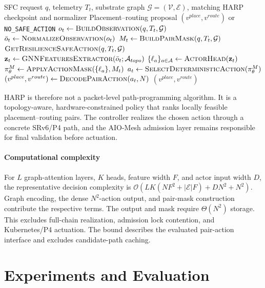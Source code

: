 \documentclass[final,5p]{elsarticle}
\newcommand{\rev}[1]{\textcolor{BrickRed}{#1}}
\begin{document}
\begin{algorithm}[t]
\caption{\rev{HARP placement--routing proposal decision procedure}}
\label{alg:harp_decision}
\small
\begin{algorithmic}[1]
\Require SFC request $q$, telemetry $T_t$, substrate graph $\mathcal{G}=(\mathcal{V},\mathcal{E})$, matching HARP checkpoint and normalizer
\Ensure Placement--routing proposal $(v^{place},v^{route})$ or \texttt{NO\_SAFE\_ACTION}
\State $o_t\gets\textsc{BuildObservation}(q,T_t,\mathcal{G})$
\State $\bar{o}_t\gets\textsc{NormalizeObservation}(o_t)$
\State $M_t\gets\textsc{BuildPairMask}(q,T_t,\mathcal{G})$
    \State \Return $\textsc{GetResilienceSafeAction}(q,T_t,\mathcal{G})$
\EndIf
\State $\mathbf{z}_t\gets\textsc{GNNFeaturesExtractor}(\bar{o}_t;\mathcal{A}_{topo})$
\State $\{\ell_a\}_{a\in\mathcal{A}}\gets\textsc{ActorHead}(\mathbf{z}_t)$
\State $\pi^M_\theta\gets\textsc{ApplyActionMask}(\{\ell_a\},M_t)$
\State $a_t\gets\textsc{SelectDeterministicAction}(\pi^M_\theta)$
\State $(v^{place},v^{route})\gets\textsc{DecodePairAction}(a_t,N)$
\State \Return $(v^{place},v^{route})$
\end{algorithmic}
\end{algorithm}

HARP is therefore not a packet-level path-programming algorithm. It is a topology-aware, hardware-constrained policy that ranks \rev{locally feasible placement--routing pairs}. The controller realizes the chosen action through a concrete SRv6/P4 path, and the AIO-Mesh admission layer remains responsible for final validation before actuation.

\rev{\paragraph{Computational complexity}\label{subsec:harp_complexity} For \(L\) graph-attention layers, \(K\) heads, feature width \(F\), and actor input width \(D\), the representative decision complexity is \(\mathcal O(LK(NF^2+|\mathcal E|F)+DN^2+N^2)\). Graph encoding, the dense \(N^2\)-action output, and pair-mask construction contribute the respective terms. The output and mask require \(\Theta(N^2)\) storage. This excludes full-chain realization, admission lock contention, and Kubernetes/P4 actuation. \rev{The bound describes the evaluated pair-action interface and excludes candidate-path caching.}}

\section{Experiments and Evaluation}
\label{sec:evaluation}
\end{document}
